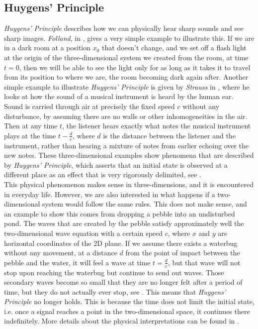 \documentclass[a4paper, 12pt]{article}
\numberwithin{equation}{section}
\begin{document}
\subsection{Huygens' Principle}
\emph{Huygens' Principle} describes how we can physically hear sharp sounds and
see sharp images. \emph{Folland}, in \cite[Ch 5.B]{Fol}, gives a very simple
example to illustrate this. If we are in a dark room at a position $x_0$ that
doesn't change, and we set off a flash light at the origin of the
three-dimensional system we created from the room, at time $t=0$, then we will
be able to see the light only for as long as it takes it to travel from its
position to where we are, the room becoming dark again after. Another simple
example to illustrate \emph{Huygens' Principle} is given by \emph{Strauss} in
\cite[Ch. 9.2]{Str}, where he looks at how the sound of a musical instrument is
heard by the human ear. Sound is carried through air at precisely the fixed
speed $c$ without any disturbance, by assuming there are no walls or other
inhomogeneities in the air. Then at any time $t$, the listener hears exactly what
notes the musical instrument plays at the time $t-\frac{d}{c}$, where $d$ is the
distance between the listener and the instrument, rather than hearing a mixture
of notes from earlier echoing over the new notes. These three-dimensional
examples show phenomena that are described by \emph{Huygens' Principle}, which
asserts that an initial state is observed at a different place as an effect that
is very rigorously delimited, see \cite[Ch. III, \S 4.6]{Hil} . \\

This physical phenomenon makes sense in three-dimensions, and it is encountered
in everyday life. However, we are also interested in what happens if a
two-dimensional system would follow the same rules. This does not make sense,
and an example to show this comes from dropping a pebble into an undisturbed
pond. The waves that are created by the pebble satisfy approximately well the
two-dimensional wave equation with a certain speed $c$, where $x$ and $y$ are
horizontal coordinates of the 2D plane. If we assume there exists a waterbug
without any movement, at a distance $d$ from the point of impact between the
pebble and the water, it will feel a wave at time $t=\frac{d}{c}$, but that wave
will not stop upon reaching the waterbug but continue to send out waves. Those
secondary waves become so small that they are no longer felt after a period of
time, but they do not actually ever stop, see \cite[Ch. 9.2]{Str}. This means
that \emph{Huygens' Principle} no longer holds. This is because the time does
not limit the initial state, i.e. once a signal reaches a point in the
two-dimensional space, it continues there indefinitely. More details about the
physical interpretations can be found in \cite[Ch. III, \S 4.6]{Hil}. \\
\end{document}
